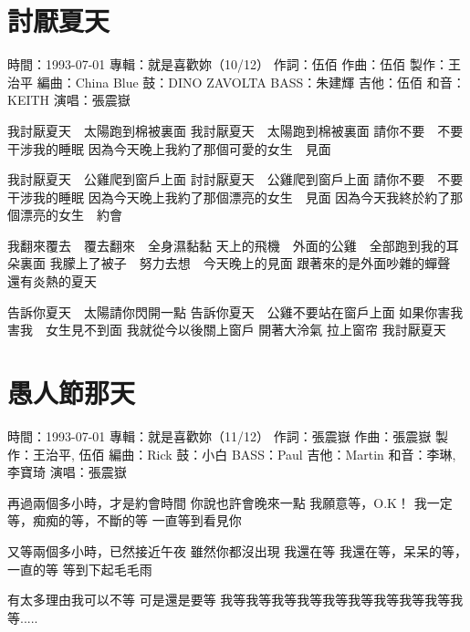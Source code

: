 \documentclass[UTF8,a4paper,oneside,twocolumn,12pt]{ctexbook}
\newcommand{\infopair}[2]{\textbullet #1：#2}
\newcommand{\zc}[1][伍佰]{\infopair{作詞}{#1}}
\newcommand{\zq}[1][伍佰]{\infopair{作曲}{#1}}
\newcommand{\bq}[1][伍佰]{\infopair{編曲}{#1}}
\newcommand{\zj}[1]{\infopair{專輯}{#1}}
\newcommand{\zz}[1]{\infopair{製作}{#1}}
\newcommand{\sj}[1]{\infopair{時間}{#1}}
\newenvironment{info}{\begin{flushleft}\kaishu
	}
	{\end{flushleft}\normalsize\yahei\par}
\newenvironment{lyric}{
	}
{}
\begin{document}
\section{討厭夏天}
\begin{info}
	\sj{1993-07-01}
	\zj{就是喜歡妳（10/12）}
	\zc
	\zq
	\zz{王治平}
	\bq[China Blue]
	\infopair{鼓}{DINO ZAVOLTA}
	\infopair{BASS}{朱建輝}
	\infopair{吉他}{伍佰}
	\infopair{和音}{KEITH}
	\infopair{演唱}{張震嶽}
\end{info}
\begin{lyric}
	我討厭夏天　太陽跑到棉被裏面
	我討厭夏天　太陽跑到棉被裏面
	請你不要　不要　干涉我的睡眠
	因為今天晚上我約了那個可愛的女生　見面

	我討厭夏天　公雞爬到窗戶上面
	討討厭夏天　公雞爬到窗戶上面
	請你不要　不要　干涉我的睡眠
	因為今天晚上我約了那個漂亮的女生　見面
	因為今天我終於約了那個漂亮的女生　約會

	我翻來覆去　覆去翻來　全身濕黏黏
	天上的飛機　外面的公雞　全部跑到我的耳朵裏面
	我朦上了被子　努力去想　今天晚上的見面
	跟著來的是外面吵雜的蟬聲　還有炎熱的夏天

	告訴你夏天　太陽請你閃開一點
	告訴你夏天　公雞不要站在窗戶上面
	如果你害我　害我　女生見不到面
	我就從今以後關上窗戶
	開著大泠氣
	拉上窗帘
	我討厭夏天
\end{lyric}

\section{愚人節那天}
\begin{info}
	\sj{1993-07-01}
	\zj{就是喜歡妳（11/12）}
	\zc[張震嶽]
	\zq[張震嶽]
	\zz{王治平, 伍佰}
	\bq[Rick]
	\infopair{鼓}{小白}
	\infopair{BASS}{Paul}
	\infopair{吉他}{Martin}
	\infopair{和音}{李琳, 李寶琦}
	\infopair{演唱}{張震嶽}
\end{info}
\begin{lyric}
	再過兩個多小時，才是約會時間
	你說也許會晚來一點
	我願意等，O.K！
	我一定等，痴痴的等，不斷的等
	一直等到看見你

	又等兩個多小時，已然接近午夜
	雖然你都沒出現
	我還在等
	我還在等，呆呆的等，一直的等
	等到下起毛毛雨

	有太多理由我可以不等
	可是還是要等
	我等我等我等我等我等我等我等我等我等我等.....
\end{lyric}
\end{document}
